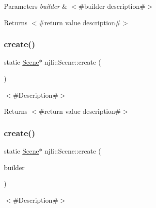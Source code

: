 \begin{DoxyParams}{Parameters}
{\em builder} & $<$\#builder description\#$>$\\
\hline
\end{DoxyParams}
\begin{DoxyReturn}{Returns}
$<$\#return value description\#$>$ 
\end{DoxyReturn}
\mbox{\label{classnjli_1_1_scene_a51f95c5217cfcf9968bcebc8e874a689}} 
\subsubsection{\texorpdfstring{create()}{create()}\hspace{0.1cm}{\footnotesize\ttfamily [2/3]}}
{\footnotesize\ttfamily static \mbox{\hyperlink{classnjli_1_1_scene}{Scene}}$\ast$ njli\+::\+Scene\+::create (\begin{DoxyParamCaption}{ }\end{DoxyParamCaption})\hspace{0.3cm}{\ttfamily [static]}}

$<$\#\+Description\#$>$

\begin{DoxyReturn}{Returns}
$<$\#return value description\#$>$ 
\end{DoxyReturn}
\mbox{\label{classnjli_1_1_scene_a23a898b795e134892fce27924e89c1d8}} 
\subsubsection{\texorpdfstring{create()}{create()}\hspace{0.1cm}{\footnotesize\ttfamily [3/3]}}
{\footnotesize\ttfamily static \mbox{\hyperlink{classnjli_1_1_scene}{Scene}}$\ast$ njli\+::\+Scene\+::create (\begin{DoxyParamCaption}\item[{const \mbox{\hyperlink{classnjli_1_1_scene_builder}{Scene\+Builder}} \&}]{builder }\end{DoxyParamCaption})\hspace{0.3cm}{\ttfamily [static]}}

$<$\#\+Description\#$>$


